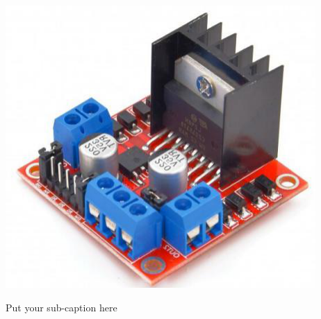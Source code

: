 \begin{marginfigure}
\centering
  \includegraphics[width=.8\linewidth]{Chapters/images/MotorDriver_board.png}  
  \caption{Put your sub-caption here}
  
\end{marginfigure}
